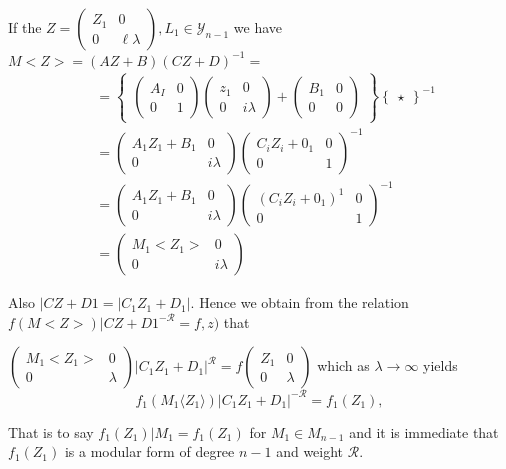 If the $Z= \begin{pmatrix} Z_1 &0 \\ 0& \ell \lambda \end{pmatrix} ,
L_1 \in \mathscr{Y}_{n-1}$ we have $M<Z> = (AZ+B) (CZ + D)^{-1}=$ 
\begin{align*}
&=\begin{Bmatrix}\begin{pmatrix}A_I &0\\ 0&
    1 \end{pmatrix} \begin{pmatrix}z_1 & 0 \\ 0 & i\lambda \end{pmatrix}
  + \begin{pmatrix}B_1 & 0 \\0 &
    0 \end{pmatrix} \end{Bmatrix}\begin{Bmatrix}
    \star \end{Bmatrix}^{-1}\\ 
&=  \begin{pmatrix}A_1 Z_1 +B_1 & 0 \\0 &
    i\lambda \end{pmatrix}  \begin{pmatrix} C_i Z_i+0_1 & 0\\ 0
    &1\end{pmatrix}^{-1}  \\ 
&=  \begin{pmatrix}A_1 Z_1 +B_1 & 0 \\0 &
      i\lambda \end{pmatrix}  \begin{pmatrix} (C_i Z_i+0_1)^1 & 0\\ 0
      &1\end{pmatrix}^{-1}  \\ 
&= \begin{pmatrix} M_1 < Z_1> & 0\\0 & i\lambda \end{pmatrix} 
\end{align*}\pageoriginale

Also $|CZ+D1= |C_1 Z_1 +D_1|$. Hence we obtain from the relation $f(M <
Z>)  |CZ+D1^{-\mathscr{R}}= f, z)$ that 

$\begin{pmatrix} M_1 < Z_1> & 0\\  0 & \lambda \end{pmatrix} |C_1 Z_1
+D_1|^{\mathscr{R}}=f \begin{pmatrix} Z_1 & 0\\ 0 &
  \lambda \end{pmatrix}$ 
which as $\lambda \to \infty$ yields 
$$
f_1 (M_1 \langle Z_1 \rangle)|C_1 Z_1+D_1|^{- \mathscr{R}}= f_1(Z_1),
$$

That is to say $f_1(Z_1) |M_1= f_1(Z_1)$ for $M_1 \in M_{n-1}$ and it
is immediate that $f_1(Z_1)$ is a modular form of degree $n-1$ and
weight $\mathscr{R}$. 

